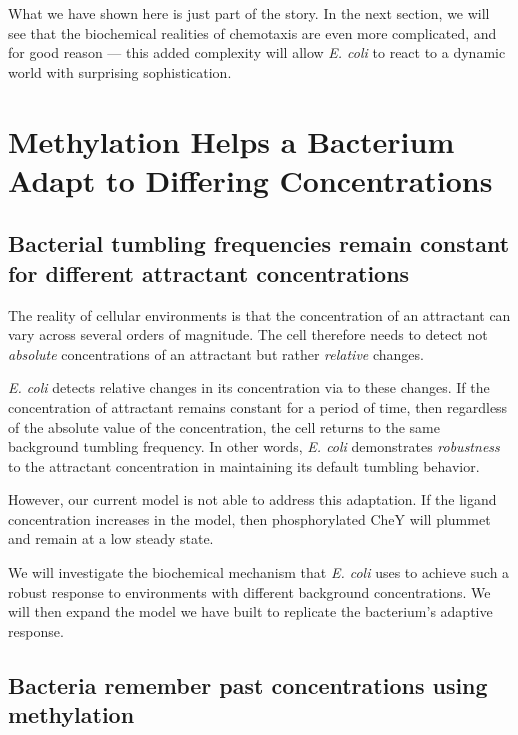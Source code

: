 What we have shown here is just part of the story. In the next section, we will see that the biochemical realities of chemotaxis are even more complicated, and for good reason --- this added complexity will allow \textit{E. coli} to react to a dynamic world with surprising sophistication.\\

\FloatBarrier
{}

\section{Methylation Helps a Bacterium Adapt to Differing Concentrations}
\label{sec:methylation}

\subsection{Bacterial tumbling frequencies remain constant for different attractant concentrations}

The reality of cellular environments is that the concentration of an attractant can vary across several orders of magnitude. The cell therefore needs to detect not \textit{absolute} concentrations of an attractant but rather \textit{relative} changes.

\textit{E. coli} detects relative changes in its concentration via  to these changes. If the concentration of attractant remains constant for a period of time, then regardless of the absolute value of the concentration, the cell returns to the same background tumbling frequency. In other words, \textit{E. coli} demonstrates \textit{robustness} to the attractant concentration in maintaining its default tumbling behavior.

However, our current model is not able to address this adaptation. If the ligand concentration increases in the model, then phosphorylated CheY will plummet and remain at a low steady state.

We will investigate the biochemical mechanism that \textit{E. coli} uses to achieve such a robust response to environments with different background concentrations. We will then expand the model we have built to replicate the bacterium's adaptive response.

\FloatBarrier
{}
\subsection{Bacteria remember past concentrations using methylation}

